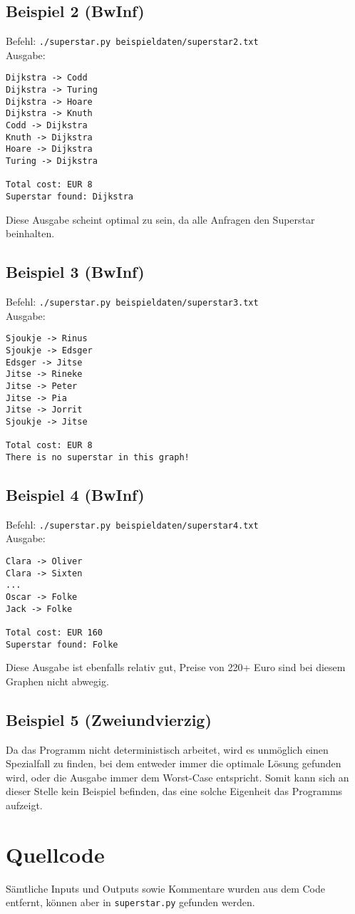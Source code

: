 \documentclass[a4paper,10pt,ngerman]{scrartcl}
\begin{document}
\subsection{Beispiel 2 (BwInf)}
Befehl: \texttt{./superstar.py beispieldaten/superstar2.txt}\\
Ausgabe:
\begin{verbatim}
Dijkstra -> Codd
Dijkstra -> Turing
Dijkstra -> Hoare
Dijkstra -> Knuth
Codd -> Dijkstra
Knuth -> Dijkstra
Hoare -> Dijkstra
Turing -> Dijkstra

Total cost: EUR 8
Superstar found: Dijkstra
\end{verbatim}
Diese Ausgabe scheint optimal zu sein, da alle Anfragen den Superstar beinhalten.
\subsection{Beispiel 3 (BwInf)}
Befehl: \texttt{./superstar.py beispieldaten/superstar3.txt}\\
Ausgabe:
\begin{verbatim}
Sjoukje -> Rinus
Sjoukje -> Edsger
Edsger -> Jitse
Jitse -> Rineke
Jitse -> Peter
Jitse -> Pia
Jitse -> Jorrit
Sjoukje -> Jitse

Total cost: EUR 8
There is no superstar in this graph!
\end{verbatim}
\subsection{Beispiel 4 (BwInf)}
Befehl: \texttt{./superstar.py beispieldaten/superstar4.txt}\\
Ausgabe:
\begin{verbatim}
Clara -> Oliver
Clara -> Sixten
...
Oscar -> Folke
Jack -> Folke

Total cost: EUR 160
Superstar found: Folke 
\end{verbatim}
Diese Ausgabe ist ebenfalls relativ gut, Preise von 220+ Euro sind bei diesem 
Graphen nicht abwegig.
\subsection{Beispiel 5 (Zweiundvierzig)}
Da das Programm nicht deterministisch arbeitet, wird es unm\"oglich einen Spezialfall
zu finden, bei dem entweder immer die optimale L\"osung gefunden wird, oder die Ausgabe
immer dem Worst-Case entspricht. Somit kann sich an dieser Stelle kein Beispiel befinden,
das eine solche Eigenheit das Programms aufzeigt.
\section{Quellcode}
S\"amtliche Inputs und Outputs sowie Kommentare wurden aus dem Code entfernt, k\"onnen
aber in \texttt{superstar.py} gefunden werden.
\end{document}
